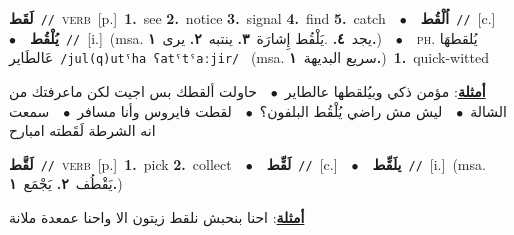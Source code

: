 \documentclass[10pt,a4paper,twoside]{article} %
\begin{document}
\begin{multicols}{2}
{\setlength\topsep{0pt}\textbf{\foreignlanguage{arabic}{لَقَط}}\ {\color{gray}\texttt{//}\color{black}}\ \textsc{verb}\ [p.]\ \textbf{1.}~see  \textbf{2.}~notice  \textbf{3.}~signal  \textbf{4.}~find  \textbf{5.}~catch\ \ $\bullet$\ \ \setlength\topsep{0pt}\textbf{\foreignlanguage{arabic}{اُلْقُط}}\ {\color{gray}\texttt{//}\color{black}}\ [c.]\ \ $\bullet$\ \ \setlength\topsep{0pt}\textbf{\foreignlanguage{arabic}{يُلْقُط}}\ {\color{gray}\texttt{//}\color{black}}\ [i.]\ \color{gray}(msa. \foreignlanguage{arabic}{يجد}~\foreignlanguage{arabic}{\textbf{٤.}}  .\foreignlanguage{arabic}{يَلْقُط إِشارَة}~\foreignlanguage{arabic}{\textbf{٣.}}  \foreignlanguage{arabic}{ينتبه}~\foreignlanguage{arabic}{\textbf{٢.}}  \foreignlanguage{arabic}{يرى}~\foreignlanguage{arabic}{\textbf{١.}})\color{black}\ \ $\bullet$\ \ \textsc{ph.} \color{gray} \foreignlanguage{arabic}{يُلقطهَا عَالطَاير}\color{black}\ {\color{gray}\texttt{/{\sffamily jul(q)utˤha ʕatˤtˤaːjir}/}\color{black}}\ \color{gray} (msa. \foreignlanguage{arabic}{سريع البديهة}~\foreignlanguage{arabic}{\textbf{١.}})\color{black}\ \textbf{1.}~quick-witted\  \begin{flushright}\color{gray}\foreignlanguage{arabic}{\textbf{\underline{\foreignlanguage{arabic}{أمثلة}}}: مؤمن ذكي وبيُلقطها عالطاير\ $\bullet$\ \  حاولت ألقطك بس اجيت لكن ماعرفتك من الشالة\ $\bullet$\ \  ليش مش راضي يُلْقُط البلفون؟\ $\bullet$\ \  لقطت فايروس وأنا مسافر\ $\bullet$\ \  سمعت انه الشرطة لَقَطته امبارح}\end{flushright}\color{black}} \vspace{2mm}

{\setlength\topsep{0pt}\textbf{\foreignlanguage{arabic}{لَقَّط}}\ {\color{gray}\texttt{//}\color{black}}\ \textsc{verb}\ [p.]\ \textbf{1.}~pick  \textbf{2.}~collect\ \ $\bullet$\ \ \setlength\topsep{0pt}\textbf{\foreignlanguage{arabic}{لَقِّط}}\ {\color{gray}\texttt{//}\color{black}}\ [c.]\ \ $\bullet$\ \ \setlength\topsep{0pt}\textbf{\foreignlanguage{arabic}{يلَقِّط}}\ {\color{gray}\texttt{//}\color{black}}\ [i.]\ \color{gray}(msa. \foreignlanguage{arabic}{يَقْطُف}~\foreignlanguage{arabic}{\textbf{٢.}}  \foreignlanguage{arabic}{يَجْمَع}~\foreignlanguage{arabic}{\textbf{١.}})\color{black}\  \begin{flushright}\color{gray}\foreignlanguage{arabic}{\textbf{\underline{\foreignlanguage{arabic}{أمثلة}}}: احنا بنحبش نلقط زيتون الا واحنا عمعدة ملانة}\end{flushright}\color{black}} \vspace{2mm}


\end{multicols}
\end{document}
